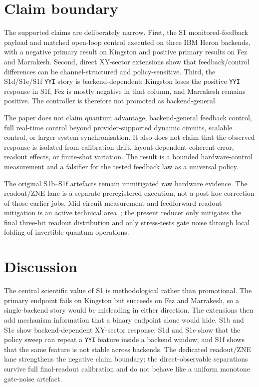 \documentclass[preprint,aps,physrev,superscriptaddress,floatfix,longbibliography]{revtex4-2}
\begin{document}
\section{Claim boundary}

The supported claims are deliberately narrow. First, the S1 monitored-feedback
payload and matched open-loop control executed on three IBM Heron backends,
with a negative primary result on Kingston and positive primary results on
Fez and Marrakesh. Second, direct XY-sector extensions show that
feedback/control differences can be channel-structured and policy-sensitive.
Third, the S1d/S1e/S1f \texttt{YYI} story is backend-dependent: Kingston loses
the positive \texttt{YYI} response in S1f, Fez is mostly negative in that
column, and Marrakesh remains positive. The controller is therefore not
promoted as backend-general.

The paper does not claim quantum advantage, backend-general feedback control,
full real-time control beyond provider-supported dynamic circuits, scalable
control, or larger-system synchronisation. It also does not claim that the
observed response is isolated from calibration drift, layout-dependent
coherent error, readout effects, or finite-shot variation. The result is a
bounded hardware-control measurement and a falsifier for the tested feedback
law as a universal policy.

The original S1b--S1f artefacts remain unmitigated raw hardware evidence. The
readout/ZNE lane is a separate preregistered execution, not a post hoc
correction of those earlier jobs. Mid-circuit measurement and feedforward
readout mitigation is an active technical area~\cite{KohKohThompson2026};
the present reducer only mitigates the final three-bit readout distribution
and only stress-tests gate noise through local folding of invertible quantum
operations.

\section{Discussion}

The central scientific value of S1 is methodological rather than promotional.
The primary endpoint fails on Kingston but succeeds on Fez and Marrakesh, so a
single-backend story would be misleading in either direction. The extensions
then add mechanism information that a binary endpoint alone would hide. S1b
and S1c show backend-dependent XY-sector response; S1d and S1e show that the
policy sweep can repeat a \texttt{YYI} feature inside a backend window; and
S1f shows that the same feature is not stable across backends. The dedicated
readout/ZNE lane strengthens the negative claim boundary: the
direct-observable separations survive full final-readout calibration and do
not behave like a uniform monotone gate-noise artefact.
\end{document}

